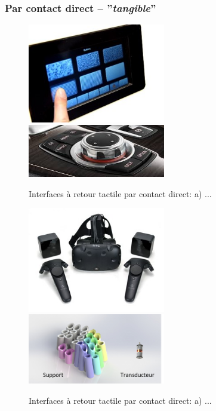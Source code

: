 \subsubsection{Par contact direct -- ''\textit{tangible}''}
\begin{figure}[!h]
	\centering
	\includegraphics[width=6cm]{Photos/tangible_cea_e-t.jpg}\hspace{2cm}
	\includegraphics[width=6cm]{Photos/tangible_cea_magneto.png}
	\caption{Interfaces à retour tactile par contact direct: a) ... }\label{int_retourd_1}
\end{figure}
\begin{figure}[!h]
	\centering
	\includegraphics[width=6cm]{Photos/tangible_vive.jpg}\hspace{2cm}
	\includegraphics[width=6cm]{Photos/tangible_com_hapt.png}
	\caption{Interfaces à retour tactile par contact direct: a) ... }\label{int_retourd_2}
\end{figure}


